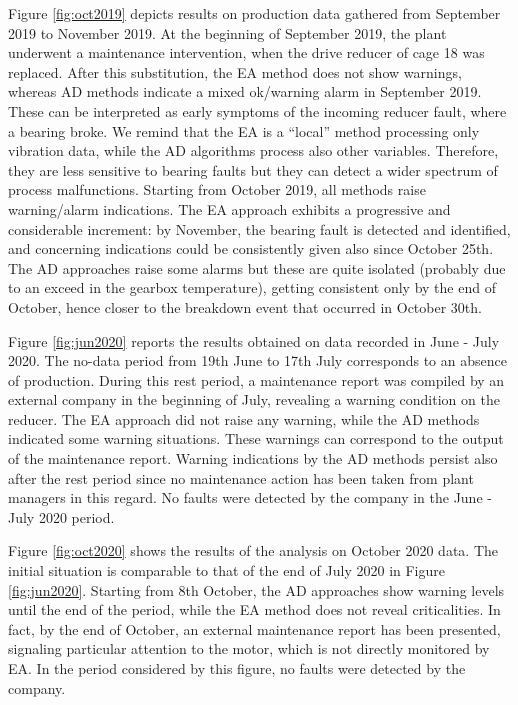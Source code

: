 Figure \ref{fig:oct2019} depicts results on production data {gathered} from September 2019 to November 2019. At the beginning of September 2019, the plant underwent a maintenance intervention, {when} the drive reducer of cage 18 was replaced. After this substitution, the EA method does not show warnings, {whereas AD methods indicate a mixed ok/warning alarm in September 2019}. These can be interpreted as early symptoms of the incoming reducer fault, where a bearing broke. We remind that the EA is a ``local'' method processing only vibration data, while the AD {algorithms process} also other variables. Therefore, they are less sensitive to bearing faults but they can {detect} a wider spectrum of process malfunctions. Starting from October 2019, all methods raise warning/alarm indications. The EA approach exhibits a progressive and considerable increment: by November, the bearing fault is detected and identified, and concerning indications could be consistently given also since  October 25th. The AD approaches raise some alarms but these are quite isolated (probably due to an exceed in the gearbox temperature), getting consistent only by the end of October, hence closer to the breakdown event that occurred in October 30th.


Figure \ref{fig:jun2020} reports the results obtained on data recorded in June - July 2020. The no-data period from 19th June to 17th July corresponds to an absence of production. During this rest period, a maintenance report was compiled by an external company in the beginning of July, revealing a warning condition on the reducer. The EA approach did not raise any warning, while the AD methods indicated some warning situations. These warnings can correspond to the output of the maintenance report.
Warning indications by the AD methods persist also after the rest period since no {maintenance} action has been taken {from plant managers} in this regard.  No faults were detected by the company in the June - July 2020 period.



Figure \ref{fig:oct2020} shows the results {of the analysis} on October 2020 data. The initial situation is comparable to that of the end of July 2020 in Figure \ref{fig:jun2020}.  Starting from 8th October, the AD approaches show warning levels until the end of the period, while the EA method does not reveal criticalities. In fact, by the end of October, an external maintenance report has been presented, signaling particular attention to the motor, which is not directly monitored by EA. In the period considered by this figure, no faults were detected by the company.



